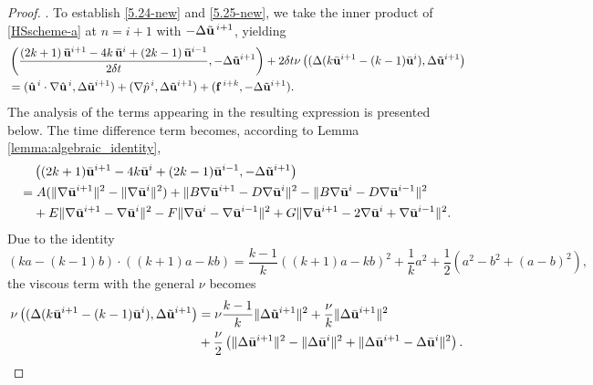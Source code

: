 \documentclass{article}
\theoremstyle{definition}                   %
\begin{document}
\begin{proof}
.
%
To establish \eqref{5.24-new} and \eqref{5.25-new}, we take the inner product of
\eqref{HSscheme-a} at $n=i+1$ with $-\Delta \tilde{\bf u}^{\,i+1}$, yielding
\begin{align}
 &\left( \frac{ (2k+1)\,\mathbf{\bar{u}}^{i+1} - 4k\,\mathbf{\bar{u}}^{i} + (2k-1)\,\mathbf{\bar{u}}^{i-1} } {2\delta t}, -\Delta  \tilde{\bf u}^{i+1} \right)
+ 2\delta t \nu \left((\Delta(k\bar{\mathbf{u}}^{i+1} - (k-1)\bar{\mathbf{u}}^i), \Delta \tilde{\mathbf{u}}^{i+1}\right)
\notag\\
 &=
 ( \hat{\mathbf{u}}^{\,i} \cdot \nabla \hat{\mathbf{u}}^{\,i}, \Delta  \tilde{\bf u}^{i+1}) 
+ ( \nabla \hat{p}^{\,i}, \Delta  \tilde{\bf u}^{i+1})
+ ( \mathbf{f}^{\,i+k}, -\Delta  \tilde{\bf u}^{i+1}).
\label{cat0090}
\end{align}
The analysis of the terms appearing in the resulting expression is presented below.
The time difference term becomes, according to Lemma\,\ref{lemma:algebraic_identity}, 
\begin{align}
&\left((2k+1)\bar{\mathbf{u}}^{i+1} - 4k\bar{\mathbf{u}}^i + (2k-1)\bar{\mathbf{u}}^{i-1}, -\Delta \tilde{\mathbf{u}}^{i+1}\right)\notag\\
=&\; A(\|\nabla\bar{\mathbf{u}}^{i+1}\|^2 - \|\nabla\bar{\mathbf{u}}^i\|^2) + \|B\nabla\bar{\mathbf{u}}^{i+1} - D\nabla\bar{\mathbf{u}}^i\|^2
- \|B\nabla\bar{\mathbf{u}}^i - D\nabla\bar{\mathbf{u}}^{i-1}\|^2 \notag\\
& + E\|\nabla\bar{\mathbf{u}}^{i+1} - \nabla\bar{\mathbf{u}}^i\|^2 
- F\|\nabla\bar{\mathbf{u}}^i - \nabla\bar{\mathbf{u}}^{i-1}\|^2 + G\|\nabla\bar{\mathbf{u}}^{i+1} - 2\nabla\bar{\mathbf{u}}^i + \nabla\bar{\mathbf{u}}^{i-1}\|^2. 
\label{5.11-new}
\end{align}
%
Due to the identity 
\begin{equation}
(ka-(k-1)b)\cdot ((k+1)a-kb)
= \frac{k-1}{k} ((k+1)a-kb)^2 + \frac{1}{k}a^2
+ \frac{1}{2} ( a^2 - b^2 + (a-b)^2),
\end{equation}
the viscous term with the general $\nu$ becomes
\begin{align}
\nu \left((\Delta(k\bar{\mathbf{u}}^{i+1} - (k-1)\bar{\mathbf{u}}^i), \Delta \tilde{\mathbf{u}}^{i+1}\right)
&= \nu \frac{k-1}{k} \|\Delta \tilde{\mathbf{u}}^{i+1}\|^2 + \frac{\nu}{k} \|\Delta\bar{\mathbf{u}}^{i+1}\|^2 \notag\\ 
&+ \frac{\nu}{2} \left(\|\Delta\bar{\mathbf{u}}^{i+1}\|^2 - \|\Delta\bar{\mathbf{u}}^i\|^2 + \|\Delta\bar{\mathbf{u}}^{i+1} - \Delta\bar{\mathbf{u}}^i\|^2\right).
\label{5.12-new}
\end{align}



\end{proof}
\end{document}
